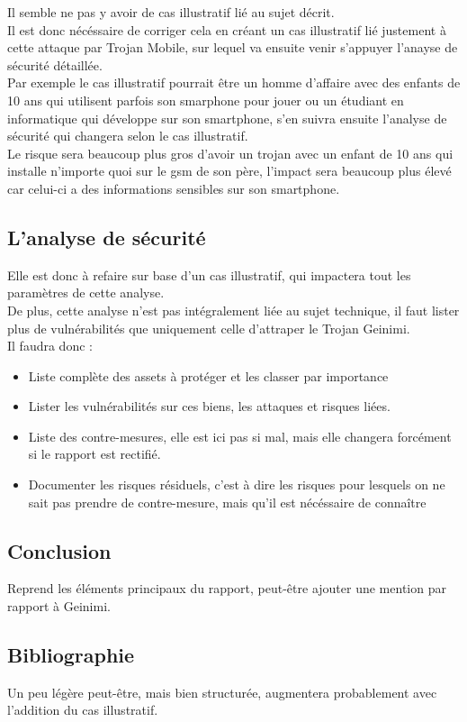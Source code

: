 \documentclass[a4paper,10pt,final,fleqn]{article}
\begin{document}
			Il semble ne pas y avoir de cas illustratif lié au sujet décrit.\\

			Il est donc nécéssaire de corriger cela en créant un cas illustratif lié justement à cette attaque par Trojan Mobile, sur lequel va ensuite venir s'appuyer l'anayse de sécurité détaillée.\\
			Par exemple le cas illustratif pourrait être un homme d'affaire avec des enfants de 10 ans qui utilisent parfois son smarphone pour jouer ou un étudiant en informatique qui développe sur son smartphone, s'en suivra ensuite l'analyse de sécurité qui changera selon le cas illustratif.\\
			Le risque sera beaucoup plus gros d'avoir un trojan avec un enfant de 10 ans qui installe n'importe quoi sur le gsm de son père, l'impact sera beaucoup plus élevé car celui-ci a des informations sensibles sur son smartphone.\\

		\subsection{L'analyse de sécurité}

			Elle est donc à refaire sur base d'un cas illustratif, qui impactera tout les paramètres de cette analyse.\\

			De plus, cette analyse n'est pas intégralement liée au sujet technique, il faut lister plus de vulnérabilités que uniquement celle d'attraper le Trojan Geinimi.\\

			Il faudra donc : \\

			\begin{itemize}
				\item Liste complète des assets à protéger et les classer par importance
				\item Lister les vulnérabilités sur ces biens, les attaques et risques liées.
				\item Liste des contre-mesures, elle est ici pas si mal, mais elle changera forcément si le rapport est rectifié.
				\item Documenter les risques résiduels, c'est à dire les risques pour lesquels on ne sait pas prendre de contre-mesure, mais qu'il est nécéssaire de connaître
			\end{itemize}


		\subsection{Conclusion}

			Reprend les éléments principaux du rapport, peut-être ajouter une mention par rapport à Geinimi.\\

		\subsection{Bibliographie}

			Un peu légère peut-être, mais bien structurée, augmentera probablement avec l'addition du cas illustratif.\\
\end{document}
